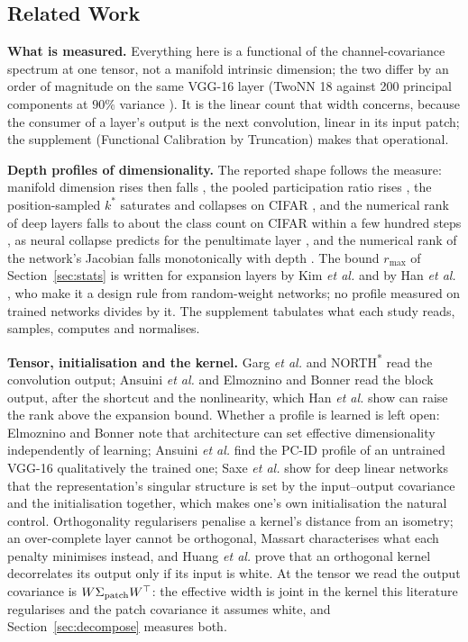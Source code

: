 \documentclass[10pt,journal,compsoc]{IEEEtran}
\begin{document}
\subsection{Related Work}
\label{sec:related}

\textbf{What is measured.}\label{sec:four} Everything here is a functional of
the channel-covariance spectrum at one tensor, not a manifold intrinsic
dimension; the two differ by an order of magnitude on the same VGG-16
layer (TwoNN 18 against 200 principal components at $90\%$
variance \cite{ansuini2019intrinsic}). It is the linear count that width
concerns, because the consumer of a layer's output is the next
convolution, linear in its input patch; the supplement (Functional Calibration by Truncation) makes
that operational.

\textbf{Depth profiles of dimensionality.}\label{sec:profiles} The
reported shape follows the measure: manifold dimension rises then falls
\cite{ansuini2019intrinsic}, the pooled participation ratio rises
\cite{elmoznino2024highDim}, the position-sampled $k^*$ saturates and
collapses on CIFAR \cite{garg2019lowEffort}, and the numerical rank of
deep layers falls to about the class count on CIFAR within a few hundred
steps \cite{masarczyk2023tunnel}, as neural collapse predicts for the
penultimate layer \cite{papyan2020neuralCollapse}, and the numerical rank
of the network's Jacobian falls monotonically with depth
\cite{feng2022rankDiminishing}. The bound $r_{\max}$
of Section~\ref{sec:stats} is written for expansion layers by Kim
\emph{et al.} \cite{kim2018rank1} and by Han \emph{et al.}
\cite{han2021rexnet}, who make it a design rule from random-weight
networks; no profile measured on trained networks divides by it. The
supplement tabulates what each study reads, samples, computes and
normalises.

\textbf{Tensor, initialisation and the kernel.}\label{sec:where} Garg
\emph{et al.} and NORTH\textsuperscript{*} \cite{maile2022north} read the
convolution output; Ansuini \emph{et al.} and Elmoznino and Bonner read
the block output, after the shortcut and the nonlinearity, which Han
\emph{et al.} show can raise the rank above the expansion bound. Whether a
profile is learned is left open: Elmoznino and Bonner note that
architecture can set effective dimensionality independently of learning;
Ansuini \emph{et al.} find the PC-ID profile of an untrained VGG-16
qualitatively the trained one; Saxe \emph{et al.} \cite{saxe2014exact}
show for deep linear networks that the representation's singular
structure is set by the input--output covariance and the initialisation
together, which makes one's own initialisation the natural control.
Orthogonality regularisers \cite{bansal2018orthogonality,huang2018own}
penalise a kernel's distance from an isometry; an over-complete layer
cannot be orthogonal, Massart \cite{massart2022orthogonal} characterises
what each penalty minimises instead, and Huang \emph{et al.}
\cite{huang2018own,huang2020oni} prove that an orthogonal kernel
decorrelates its output only if its input is white. At the tensor we read
the output covariance is $W\Sigma_{\rm patch}W^{\top}$: the effective
width is joint in the kernel this literature regularises and the patch
covariance it assumes white, and Section~\ref{sec:decompose} measures
both.
\end{document}
